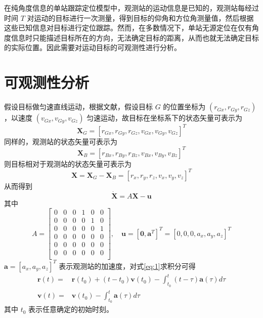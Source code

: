在纯角度信息的单站跟踪定位模型中，观测站的运动信息是已知的，观测站每经过时间 $T$ 对运动的目标进行一次测量，得到目标的仰角和方位角测量值，然后根据这些已知信息对目标进行定位跟踪。然而，在多数情况下，单站无源定位在仅有角度信息时只能描述目标所在的方向，无法确定目标的距离，从而也就无法确定目标的实际位置。因此需要对运动目标的可观测性进行分析。
\section{可观测性分析}
假设目标做匀速直线运动，根据文献\cite{4104040}，假设目标 $G$ 的位置坐标为 $(r_{Gx},r_{Gy},r_{Gz})$，以速度 $(v_{Gx},v_{Gy},v_{Gz})$ 匀速运动，故目标在坐标系下的状态矢量可表示为 
\begin{equation*}
	\bm{X}_{G} = [r_{Gx},r_{Gy},r_{Gz},v_{Gx},v_{Gy},v_{Gz}]^T
\end{equation*} 
同样的，观测站的状态矢量可表示为 
\begin{equation*}
	\bm{X}_B = [r_{Bx},r_{By},r_{Bz},v_{Bx},v_{By},v_{Bz}]^T
\end{equation*}
则目标相对于观测站的状态矢量可表示为
\begin{equation}
	\bm{X} = \bm{X}_G - \bm{X}_B = [r_x,r_y,r_z,v_x,v_y,v_z]^T
\end{equation}
从而得到
\begin{equation}
	\dot{\bm{X}} = A\bm{X} - \bm{u} \label{eq:1}
\end{equation}
其中
\begin{equation*}
		A = \left[ \begin{array}{ccc|ccc}
			0 & 0 & 0 & 1 & 0 & 0 \\
			0 & 0 & 0 & 0 & 1 & 0 \\
			0 & 0 & 0 & 0 & 0 & 1 \\ \hline 
			0 & 0 & 0 & 0 & 0 & 0 \\
			0 & 0 & 0 & 0 & 0 & 0 \\
			0 & 0 & 0 & 0 & 0 & 0 \\
		\end{array} \right ], \quad
	\bm{u} = [\bm{0}, \bm{a}^T ]^T = [0, 0, 0, a_x, a_y, a_z]^T 
\end{equation*}
$\bm{a} = [a_x,a_y,a_z]^T$ 表示观测站的加速度，对式\ref{eq:1}求积分可得
\begin{equation}
	\begin{split}
		\bm{r}(t) =& \bm{r}(t_0) + (t-t_0)\bm{v}(t_0) - \int_{t_0}^{t}(t-\tau)\bm{a}(\tau)d\tau \\
		\bm{v}(t) =& \bm{v}(t_0) - \int_{t_0}^{t}\bm{a}(\tau)d\tau
	\end{split}	
\end{equation}
其中 $t_0$ 表示任意确定的初始时刻。

